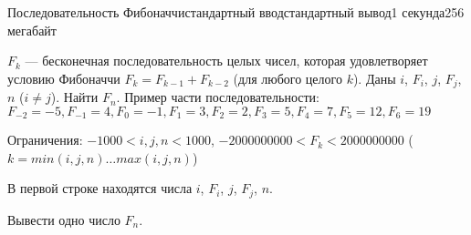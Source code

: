 \begin{problem}{Последовательность Фибоначчи}{стандартный ввод}{стандартный вывод}{1 секунда}{256 мегабайт}

$F_k$ --- бесконечная последовательность целых чисел, которая
удовлетворяет условию Фибоначчи $F_k = F_{k-1}+F_{k-2}$
(для любого целого $k$). Даны $i$, $F_i$, $j$,
$F_j$, $n$ ($i \ne j$). Найти
$F_n$. Пример части последовательности:
$F_{-2}=-5, F_{-1}=4, F_{0}=-1, F_{1}=3, F_{2}=2, F_{3}=5, F_{4}=7, F_{5}=12, F_{6}=19$

Ограничения: $-1000 < i, j, n < 1000$, 
$-2000000000 < F_k < 2000000000$
($k = min(i, j, n)\ldots max(i,j,n)$)

\InputFile
В первой строке находятся числа $i$, $F_i$, $j$, $F_j$, $n$.

\OutputFile
Вывести одно число $F_n$.

\Example

\begin{example}
%
\end{example}

\end{problem}

